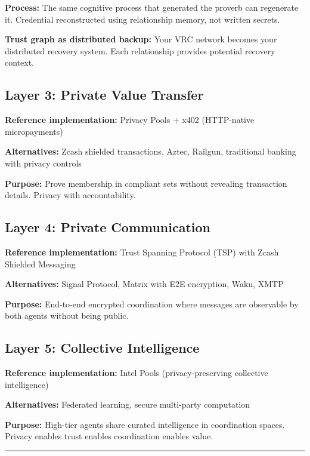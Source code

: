 \documentclass[
]{article}
\begin{document}
\textbf{Process:} The same cognitive process that generated the proverb
can regenerate it. Credential reconstructed using relationship memory,
not written secrets.

\textbf{Trust graph as distributed backup:} Your VRC network becomes
your distributed recovery system. Each relationship provides potential
recovery context.

\subsection{Layer 3: Private Value
Transfer}\label{layer-3-private-value-transfer}

\textbf{Reference implementation:} Privacy Pools + x402 (HTTP-native
micropayments)

\textbf{Alternatives:} Zcash shielded transactions, Aztec, Railgun,
traditional banking with privacy controls

\textbf{Purpose:} Prove membership in compliant sets without revealing
transaction details. Privacy with accountability.

\subsection{Layer 4: Private
Communication}\label{layer-4-private-communication}

\textbf{Reference implementation:} Trust Spanning Protocol (TSP) with
Zcash Shielded Messaging

\textbf{Alternatives:} Signal Protocol, Matrix with E2E encryption,
Waku, XMTP

\textbf{Purpose:} End-to-end encrypted coordination where messages are
observable by both agents without being public.

\subsection{Layer 5: Collective
Intelligence}\label{layer-5-collective-intelligence}

\textbf{Reference implementation:} Intel Pools (privacy-preserving
collective intelligence)

\textbf{Alternatives:} Federated learning, secure multi-party
computation

\textbf{Purpose:} High-tier agents share curated intelligence in
coordination spaces. Privacy enables trust enables coordination enables
value.

\begin{center}\rule{0.5\linewidth}{0.5pt}\end{center}
\end{document}

